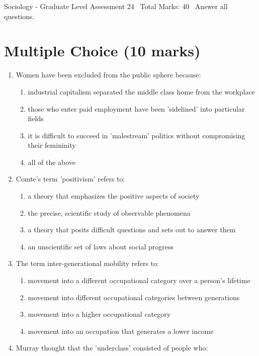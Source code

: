 \documentclass[12pt]{article}
\begin{document}
\begin{center}
Sociology - Graduate Level Assessment 24 \
Total Marks: 40 \
Answer all questions.
\end{center}

\section*{Multiple Choice (10 marks)}
\begin{enumerate}[label=\arabic*.]
\item Women have been excluded from the public sphere because:
\begin{enumerate}[label=(\alph*)]
    \item industrial capitalism separated the middle class home from the workplace
    \item those who enter paid employment have been 'sidelined' into particular fields
    \item it is difficult to succeed in 'malestream' politics without compromising their femininity
    \item all of the above
\end{enumerate}
\item Comte's term 'positivism' refers to:
\begin{enumerate}[label=(\alph*)]
    \item a theory that emphasizes the positive aspects of society
    \item the precise, scientific study of observable phenomena
    \item a theory that posits difficult questions and sets out to answer them
    \item an unscientific set of laws about social progress
\end{enumerate}
\item The term inter-generational mobility refers to:
\begin{enumerate}[label=(\alph*)]
    \item movement into a different occupational category over a person's lifetime
    \item movement into different occupational categories between generations
    \item movement into a higher occupational category
    \item movement into an occupation that generates a lower income
\end{enumerate}
\item Murray thought that the 'underclass' consisted of people who:

\end{enumerate}
\end{document}
